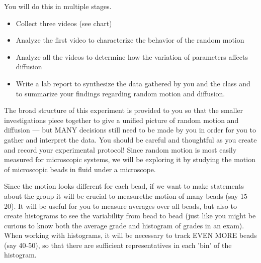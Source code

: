 You will do this in multiple stages.
\begin{itemize}
\item Collect three videos (see chart)
\item Analyze the first video to characterize the behavior of the random motion
\item Analyze all the videos to determine how the variation of parameters affects diffusion
\item Write a lab report to synthesize the data gathered by you and the class and to
summarize your findings regarding random motion and diffusion.
\end{itemize}
\par 
The broad structure of this experiment is provided to you so that the smaller investigations piece together to give a unified picture of random motion and diffusion — but MANY decisions still need to be made by you in order for you to gather and interpret the data.
You should be careful and thoughtful as you create and record your experimental protocol!
Since random motion is most easily measured for microscopic systems, we will be exploring it by studying the motion of microscopic beads in fluid under a microscope.
\par
Since the motion looks different for each bead, if we want to make statements about the group it will be crucial to measurethe motion of many beads (say 15-20).
It will be useful for you to measure averages over all beads, but also to create histograms to see the variability from bead to bead (just like you might be curious to know both the average grade and histogram of grades in an exam).
When working with histograms, it will be necessary to track EVEN MORE beads (say 40-50), so that there are sufficient representatives in each 'bin' of the histogram.
